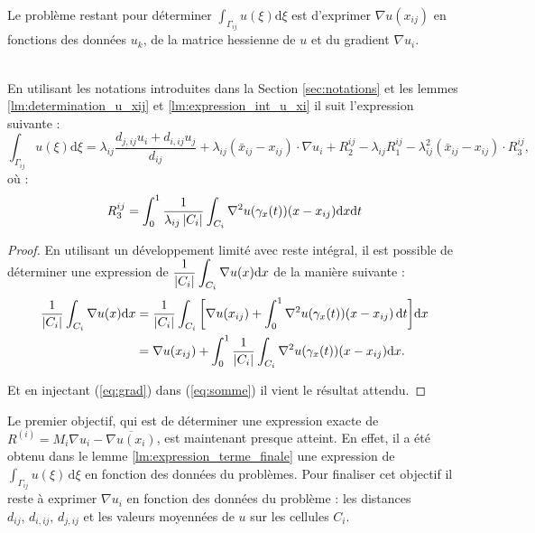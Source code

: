 \documentclass[12pt,a4paper]{article}
\begin{document}
	Le problème restant pour déterminer $\displaystyle\int_{\Gamma_{ij}} u( \xi)\mathrm d \xi$ est d'exprimer $\nabla u(x_{ij})$ en fonctions des données $u_k$, de la matrice hessienne de $u$ et du gradient $\nabla u_i$.
	
	\begin{lm}\label{lm:expression_terme_finale}$ $\\
		En utilisant les notations introduites dans la Section \ref{sec:notations} et les lemmes \ref{lm:determination_u_xij} et \ref{lm:expression_int_u_xi} il suit l'expression suivante :
		\begin{equation}\label{eq:somme_reecrite}
			\displaystyle\int_{\Gamma_{ij}} u( \xi)\mathrm d \xi = \lambda_{ij}\dfrac{d_{j,ij}u_i + d_{i,ij}u_j}{d_{ij}} + \lambda_{ij}\left( {\bar x_{ij}-x_{ij}}\right)\cdot\nabla u_i + R_2^{ij} - \lambda_{ij}R_1^{ij} - \lambda_{ij}^2\left( {\bar x_{ij}-x_{ij}}\right)\cdot R_3^{ij},
		\end{equation}
			où :
			\begin{equation}\label{eq:R3}
				R_3^{ij} = \displaystyle\int_0^1 \dfrac1{\lambda_{ij}\left\lvert C_i \right\rvert}\int_{C_i}\nabla^2 u(\gamma_x(t))({x-x_{ij}})\mathrm d  x \mathrm d t
			\end{equation}
	\end{lm}
	\begin{proof} 
			En utilisant un développement limité avec reste intégral, il est possible de déterminer une expression de $\dfrac1{\left\lvert C_i \right\rvert}\displaystyle\int_{C_i}  \nabla u(x)\mathrm dx$ de la manière suivante :
		\begin{equation}\label{eq:grad}
			\begin{aligned}[b]
				\dfrac1{\left\lvert C_i \right\rvert}\displaystyle\int_{C_i}  {\nabla u}(x)\mathrm dx &= \dfrac1{\left\lvert C_i \right\rvert}\int_{C_i} \bigg[{\nabla u}(x_{ij}) + \int_0^1 \nabla^2 u(\gamma_x(t)) (x-x_{ij})\, \mathrm dt\bigg]\mathrm d  x\\
				& = {\nabla u}(  x_{ij}) + \int_0^1 \dfrac{1}{\left\lvert C_i \right\rvert}\int_{C_i} \nabla^2u(\gamma_x(t))( x-x_{ij})\mathrm d  x.
			\end{aligned}
		\end{equation}
		
		Et en injectant (\ref{eq:grad}) dans (\ref{eq:somme}) il vient le résultat attendu.
	\end{proof}
	
	\vspace{-.5cm}
	
	Le premier objectif, qui est de déterminer une expression exacte de $R^{(i)} = M_i\nabla u_i - \overline{\nabla u(x_i)}$, est maintenant presque atteint. En effet, il a été obtenu dans le lemme \ref{lm:expression_terme_finale} une expression de $\displaystyle \int_{\Gamma_{ij}} u(\xi)\,\mathrm d\xi$ en fonction des données du problèmes. Pour finaliser cet objectif il reste à exprimer $\nabla u_i$ en fonction des données du problème : les distances $d_{ij},\, d_{i,ij},\, d_{j,ij}$ et les valeurs moyennées de $u$ sur les cellules $C_i$.
	
\end{document}
